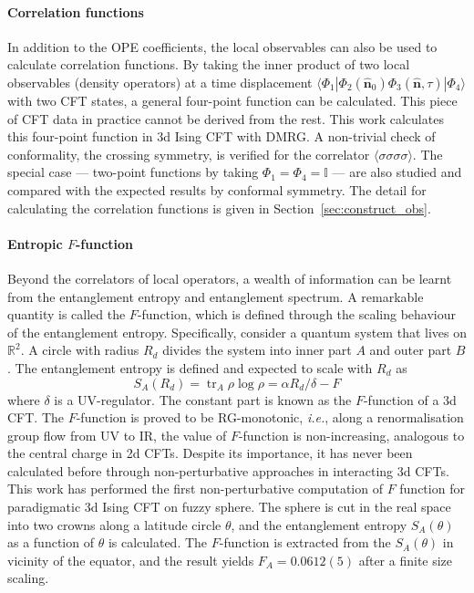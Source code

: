\documentclass{timesjhep}
\begin{document}
\paragraph{Correlation functions~\cite{Han2023Jun}}

In addition to the OPE coefficients, the local observables can also be used to calculate correlation functions. By taking the inner product of two local observables (density operators) at a time displacement $\langle\Phi_1|\Phi_2(\hat{\mathbf{n}}_0)\Phi_3(\hat{\mathbf{n}},\tau)|\Phi_4\rangle$ with two CFT states, a general four-point function can be calculated. This piece of CFT data in practice cannot be derived from the rest. This work calculates this four-point function in 3d Ising CFT with DMRG. A non-trivial check of conformality, the crossing symmetry, is verified for the correlator $\langle\sigma\sigma\sigma\sigma\rangle$. The special case --- two-point functions by taking $\Phi_1=\Phi_4=\mathbb{I}$ --- are also studied and compared with the expected results by conformal symmetry. The detail for calculating the correlation functions is given in Section~\ref{sec:construct_obs}.

\paragraph{Entropic $F$-function~\cite{Hu2024}}

Beyond the correlators of local operators, a wealth of information can be learnt from the entanglement entropy and entanglement spectrum. A remarkable quantity is called the $F$-function, which is defined through the scaling behaviour of the entanglement entropy. Specifically, consider a quantum system that lives on $\mathbb{R}^2$. A circle with radius $R_d$ divides the system into inner part $A$ and outer part $B$. The entanglement entropy is defined and expected to scale with $R_d$ as \begin{equation}
    S_A(R_d)=\operatorname{tr}_A\rho\log\rho=\alpha R_d/\delta-F 
\end{equation}
where $\delta$ is a UV-regulator. The constant part is known as the $F$-function of a 3d CFT. The $F$-function is proved to be RG-monotonic, \textit{i.e.}, along a renormalisation group flow from UV to IR, the value of $F$-function is non-increasing, analogous to the central charge in 2d CFTs. Despite its importance, it has never been calculated before through non-perturbative approaches in interacting 3d CFTs. This work has performed the first non-perturbative computation of $F$ function for paradigmatic 3d Ising CFT on fuzzy sphere. The sphere is cut in the real space into two crowns along a latitude circle $\theta$, and the entanglement entropy $S_A(\theta)$ as a function of $\theta$ is calculated. The $F$-function is extracted from the $S_A(\theta)$ in vicinity of the equator, and the result yields $F_A=0.0612(5)$ after a finite size scaling. 
\end{document}
